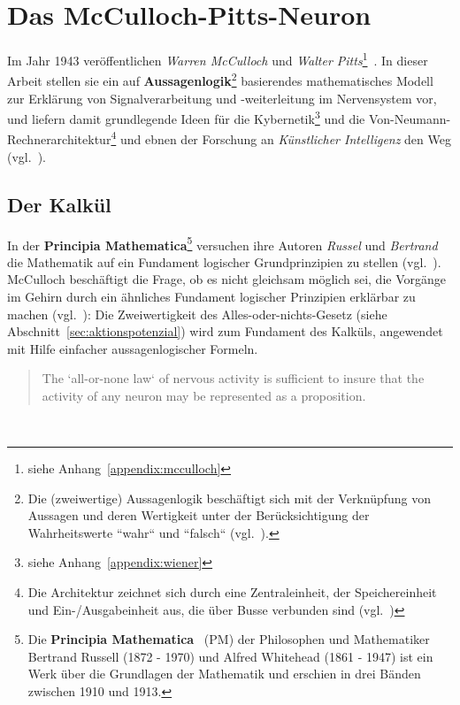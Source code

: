 \section{Das McCulloch-Pitts-Neuron}\label{sec:mcpneuron}

Im Jahr 1943 veröffentlichen \textit{Warren McCulloch} und \textit{Walter Pitts}\footnote{
    siehe Anhang~\ref{appendix:mcculloch}
}~\cite{MP43}.
In dieser Arbeit stellen sie ein auf \textbf{Aussagenlogik}\footnote{
    Die (zweiwertige) Aussagenlogik beschäftigt sich mit der Verknüpfung von Aussagen und deren Wertigkeit unter der Berücksichtigung der Wahrheitswerte ``wahr`` und ``falsch`` (vgl.~\cite[2]{Rau88}).
} basierendes mathematisches Modell zur Erklärung von Signalverarbeitung und  -weiterleitung im Nervensystem vor, und liefern damit grundlegende Ideen für die Kybernetik\footnote{
    siehe Anhang~\ref{appendix:wiener}
} und die Von-Neumann-Rechnerarchitektur\footnote{
    Die Architektur zeichnet sich durch eine Zentraleinheit, der Speichereinheit und Ein-/Ausgabeinheit aus, die über Busse verbunden sind (vgl.~\cite[230]{OV00})
} und ebnen der Forschung an \textit{Künstlicher Intelligenz} den Weg (vgl.~\cite[1]{Arb19}).


\subsection{Der Kalkül}

In der \textbf{Principia Mathematica}\footnote{
    Die \textbf{Principia Mathematica}~\cite{PW27} (PM) der Philosophen und Mathematiker Bertrand Russell (1872 - 1970) und Alfred Whitehead (1861 - 1947) ist ein Werk über die Grundlagen der Mathematik und erschien in drei Bänden zwischen 1910 und 1913.
} versuchen ihre Autoren \textit{Russel} und \textit{Bertrand} die Mathematik auf ein Fundament logischer Grundprinzipien zu stellen (vgl.~\cite[225]{She26}). McCulloch beschäftigt die Frage, ob es nicht gleichsam möglich sei, die Vorgänge im Gehirn durch ein ähnliches Fundament logischer Prinzipien erklärbar zu machen (vgl.~\cite[4]{Arb19}): Die Zweiwertigkeit des Alles-oder-nichts-Gesetz (siehe Abschnitt~\ref{sec:aktionspotenzial}) wird zum Fundament des Kalküls, angewendet mit Hilfe einfacher aussagenlogischer Formeln.\\

\blockquote[{\cite[100]{MP43}}]{
    The `all-or-none law` of nervous activity is sufficient to insure that the activity of any neuron may be represented as a proposition.
}\\

